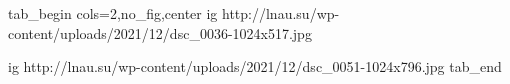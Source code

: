  
 
 
 
 

\ifcmt
tab_begin cols=2,no_fig,center
  ig http://lnau.su/wp-content/uploads/2021/12/dsc_0036-1024x517.jpg

	ig http://lnau.su/wp-content/uploads/2021/12/dsc_0051-1024x796.jpg
tab_end
\fi
